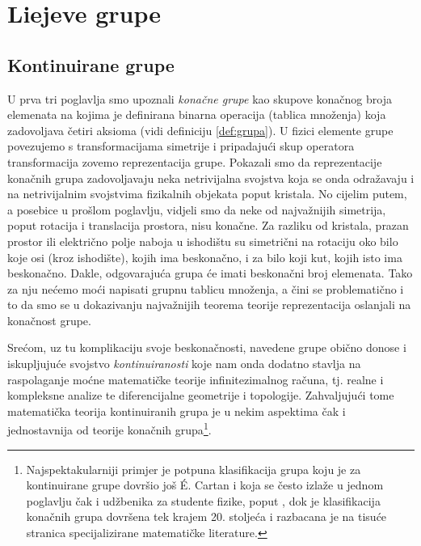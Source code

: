 
\chapter{Liejeve grupe}
\label{ch:lie}

\section{Kontinuirane grupe}


U prva tri poglavlja smo upoznali \emph{konačne grupe} kao skupove
konačnog broja elemenata na kojima je definirana binarna operacija (tablica množenja)
koja zadovoljava četiri aksioma (vidi definiciju \ref{def:grupa}). 
U fizici elemente grupe povezujemo
s transformacijama simetrije i pripadajući skup operatora transformacija
zovemo reprezentacija grupe. Pokazali smo da reprezentacije konačnih grupa
zadovoljavaju neka netrivijalna svojstva koja se onda odražavaju
i na netrivijalnim svojstvima fizikalnih objekata poput kristala.
No cijelim putem, a posebice u prošlom poglavlju, vidjeli smo da neke
od najvažnijih simetrija, poput rotacija i translacija prostora,
nisu konačne. Za razliku od kristala, prazan prostor ili električno
polje naboja u ishodištu su simetrični na rotaciju oko bilo koje
osi (kroz ishodište), kojih ima beskonačno, i za bilo koji kut, kojih
isto ima beskonačno. Dakle, odgovarajuća grupa će imati beskonačni
broj elemenata. Tako za nju nećemo moći napisati grupnu tablicu
množenja, a čini se problematično i to da smo se u dokazivanju
najvažnijih teorema teorije reprezentacija oslanjali na konačnost
grupe.

Srećom, uz tu komplikaciju svoje beskonačnosti, navedene grupe obično donose
i iskupljujuće svojstvo \emph{kontinuiranosti} koje nam onda dodatno
stavlja na raspolaganje moćne matematičke teorije infinitezimalnog računa,
tj. realne i kompleksne analize te diferencijalne geometrije i topologije.
Zahvaljujući tome matematička teorija kontinuiranih grupa je u nekim aspektima
čak i jednostavnija od teorije konačnih grupa\footnote{Najspektakularniji
    primjer je potpuna klasifikacija grupa koju je za kontinuirane
    grupe dovršio još \'{E}. Cartan 
    i koja se često izlaže u jednom poglavlju
    čak i udžbenika za studente fizike, poput \cite{Jones:1998}, dok je
    klasifikacija konačnih grupa dovršena tek krajem 20. stoljeća i razbacana
je na tisuće stranica specijalizirane matematičke literature.}.


